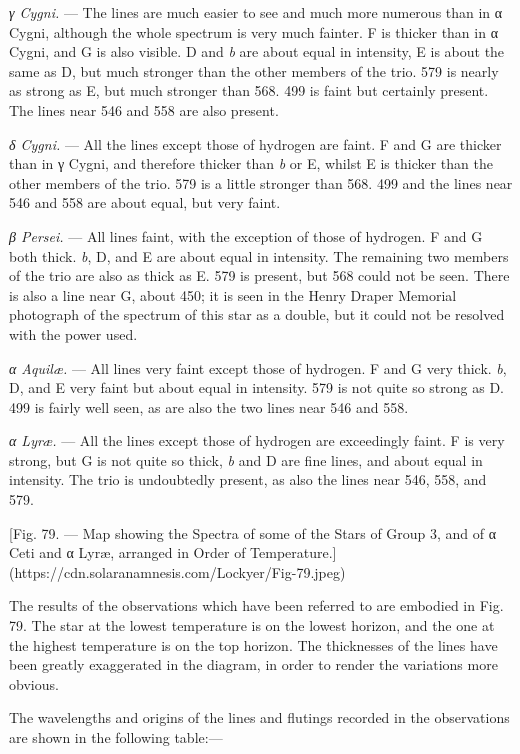 \documentclass[a4paper, 12pt, oneside, polutonikogreek, english]{article}
\begin{document}
\emph{γ Cygni.} --- The lines are much easier to see and much more numerous than in α Cygni, although the whole spectrum is very much fainter. F is thicker than in α Cygni, and G is also visible. D and \emph{b} are about equal in intensity, E is about the same as D, but much stronger than the other members of the trio. 579 is nearly as strong as E, but much stronger than 568. 499 is faint but certainly present. The lines near 546 and 558 are also present.

\emph{δ Cygni.} --- All the lines except those of hydrogen are faint. F and G are thicker than in γ Cygni, and therefore thicker than \emph{b} or E, whilst E is thicker than the other members of the trio. 579 is a little stronger than 568. 499 and the lines near 546 and 558 are about equal, but very faint.

\emph{β Persei.} --- All lines faint, with the exception of those of hydrogen. F and G both thick. \emph{b}, D, and E are about equal in intensity. The remaining two members of the trio are also as thick as E. 579 is present, but 568 could not be seen. There is also a line near G, about 450; it is seen in the Henry Draper Memorial photograph of the spectrum of this star as a double, but it could not be resolved with the power used.

\emph{α Aquilæ.} --- All lines very faint except those of hydrogen. F and G very thick. \emph{b}, D, and E very faint but about equal in intensity. 579 is not quite so strong as D. 499 is fairly well seen, as are also the two lines near 546 and 558.

\emph{α Lyræ.} --- All the lines except those of hydrogen are exceedingly faint. F is very strong, but G is not quite so thick, \emph{b} and D are fine lines, and about equal in intensity. The trio is undoubtedly present, as also the lines near 546, 558, and 579.

[Fig. 79. --- Map showing the Spectra of some of the Stars of Group 3, and of α Ceti and α Lyræ, arranged in Order of Temperature.](https://cdn.solaranamnesis.com/Lockyer/Fig-79.jpeg)

The results of the observations which have been referred to are embodied in Fig. 79. The star at the lowest temperature is on the lowest horizon, and the one at the highest temperature is on the top horizon. The thicknesses of the lines have been greatly exaggerated in the diagram, in order to render the variations more obvious.

The wavelengths and origins of the lines and flutings recorded in the observations are shown in the following table:---
\end{document}
